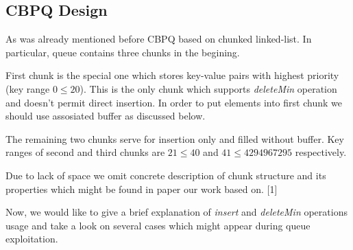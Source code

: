 \documentclass{article}
\begin{document}
\subsection{CBPQ Design}
As was already mentioned before CBPQ based on chunked linked-list. In particular, queue contains three chunks in the begining.\par
First chunk is the special one which stores key-value pairs with highest priority (key range $0 \leqslant 20$). This is the only chunk which supports \textit{deleteMin} operation and doesn't permit direct insertion. In order to put elements into first chunk we should use assosiated buffer as discussed below.\par
The remaining two chunks serve for insertion only and filled without buffer. Key ranges of second and third chunks are $21 \leqslant 40$ and $41 \leqslant 4294967295$ respectively.\par
Due to lack of space we omit concrete description of chunk structure and its properties which might be found in paper our work based on. [1]\par
Now, we would like to give a brief explanation of \textit{insert} and \textit{deleteMin} operations usage and take a look on several cases which might appear during queue exploitation.
\end{document}
